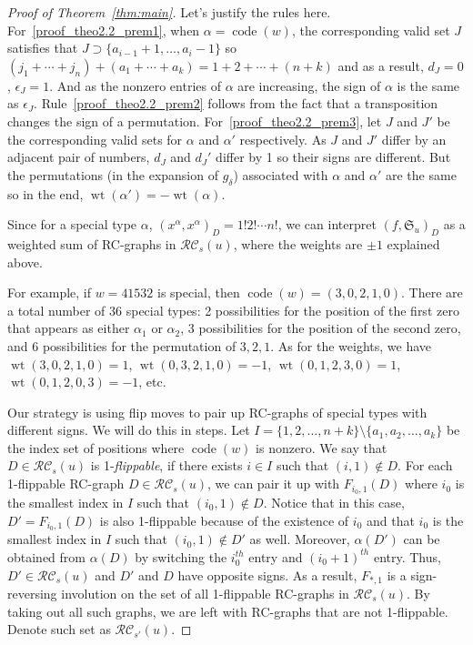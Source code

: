 \documentclass[10pt]{amsart}
\newcommand{\RC}{\mathcal{RC}}
\DeclareMathOperator{\wt}{wt}
\DeclareMathOperator{\code}{code}
\begin{document}
\begin{proof}[Proof of Theorem~\ref{thm:main}]
Let's justify the rules here. For~\eqref{proof_theo2.2_prem1}, when $\alpha=\code(w)$, the corresponding valid set $J$ satisfies that $J\supset\{a_{i-1}+1,\ldots,a_i-1\}$ so $(j_1+\cdots+j_n)+(a_1+\cdots+a_k)=1+2+\cdots+(n+k)$ and as a result, $d_J=0$, $\epsilon_J=1$. And as the nonzero entries of $\alpha$ are increasing, the sign of $\alpha$ is the same as $\epsilon_J$. Rule~\eqref{proof_theo2.2_prem2} follows from the fact that a transposition changes the sign of a permutation. For~\eqref{proof_theo2.2_prem3}, let $J$ and $J'$ be the corresponding valid sets for $\alpha$ and $\alpha'$ respectively. As $J$ and $J'$ differ by an adjacent pair of numbers, $d_J$ and $d_J'$ differ by 1 so their signs are different. But the permutations (in the expansion of $g_{\delta}$) associated with $\alpha$ and $\alpha'$ are the same so in the end, $\wt(\alpha')=-\wt(\alpha)$.

Since for a special type $\alpha$, $(x^{\alpha},x^{\alpha})_D=1!2!\cdots n!$, we can interpret $(f,\mathfrak{S}_u)_D$ as a weighted sum of RC-graphs in $\RC_s(u)$, where the weights are $\pm1$ explained above.

For example, if $w=41532$ is special, then $\code(w)=(3,0,2,1,0)$. There are a total number of 36 special types: 2 possibilities for the position of the first zero that appears as either $\alpha_1$ or $\alpha_2$, 3 possibilities for the position of the second zero, and 6 possibilities for the permutation of $3,2,1$. As for the weights, we have $\wt(3,0,2,1,0)=1$, $\wt(0,3,2,1,0)=-1$, $\wt(0,1,2,3,0)=1$, $\wt(0,1,2,0,3)=-1$, etc. 

Our strategy is using flip moves to pair up RC-graphs of special types with different signs. We will do this in steps. Let $I=\{1,2,\ldots,n+k\}\setminus\{a_1,a_2,\ldots,a_k\}$ be the index set of positions where $\code(w)$ is nonzero. We say that $D\in\RC_s(u)$ is 1-\emph{flippable}, if there exists $i\in I$ such that $(i,1)\notin D$. For each 1-flippable RC-graph $D\in\RC_s(u)$, we can pair it up with $F_{i_0,1}(D)$ where $i_0$ is the smallest index in $I$ such that $(i_0,1)\notin D$. Notice that in this case, $D'=F_{i_0,1}(D)$ is also 1-flippable because of the existence of $i_0$ and that $i_0$ is the smallest index in $I$ such that $(i_0,1)\notin D'$ as well. Moreover, $\alpha(D')$ can be obtained from $\alpha(D)$ by switching the $i_0^{th}$ entry and $(i_0+1)^{th}$ entry. Thus, $D'\in\RC_s(u)$ and $D'$ and $D$ have opposite signs. As a result, $F_{*,1}$ is a sign-reversing involution on the set of all 1-flippable RC-graphs in $\RC_s(u)$. By taking out all such graphs, we are left with RC-graphs that are not 1-flippable. Denote such set as $\RC_{s'}(u)$. 


\end{proof}
\end{document}
